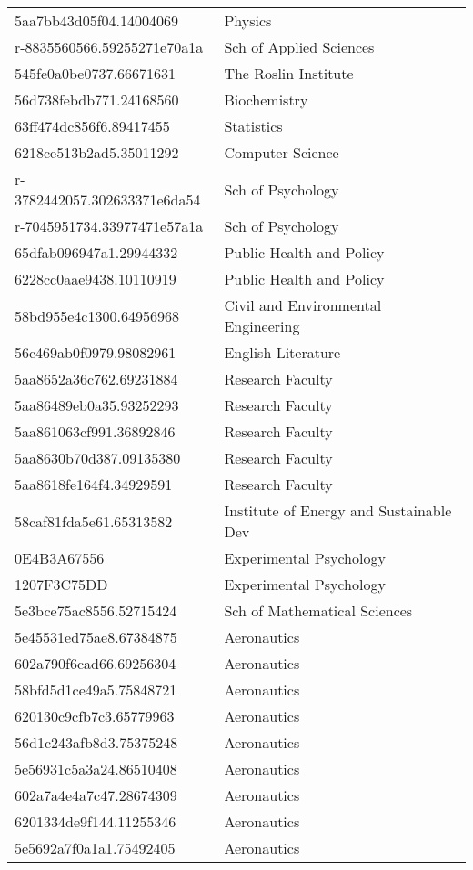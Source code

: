 \begin{tabular}{ll}
5aa7bb43d05f04.14004069 & Physics \\
r-8835560566.59255271e70a1a & Sch of Applied Sciences \\
545fe0a0be0737.66671631 & The Roslin Institute \\
56d738febdb771.24168560 & Biochemistry \\
63ff474dc856f6.89417455 & Statistics \\
6218ce513b2ad5.35011292 & Computer Science \\
r-3782442057.302633371e6da54 & Sch of Psychology \\
r-7045951734.33977471e57a1a & Sch of Psychology \\
65dfab096947a1.29944332 & Public Health and Policy \\
6228cc0aae9438.10110919 & Public Health and Policy \\
58bd955e4c1300.64956968 & Civil and Environmental Engineering \\
56c469ab0f0979.98082961 & English Literature \\
5aa8652a36c762.69231884 & Research Faculty \\
5aa86489eb0a35.93252293 & Research Faculty \\
5aa861063cf991.36892846 & Research Faculty \\
5aa8630b70d387.09135380 & Research Faculty \\
5aa8618fe164f4.34929591 & Research Faculty \\
58caf81fda5e61.65313582 & Institute of Energy and Sustainable Dev \\
0E4B3A67556 & Experimental Psychology \\
1207F3C75DD & Experimental Psychology \\
5e3bce75ac8556.52715424 & Sch of Mathematical Sciences \\
5e45531ed75ae8.67384875 & Aeronautics \\
602a790f6cad66.69256304 & Aeronautics \\
58bfd5d1ce49a5.75848721 & Aeronautics \\
620130c9cfb7c3.65779963 & Aeronautics \\
56d1c243afb8d3.75375248 & Aeronautics \\
5e56931c5a3a24.86510408 & Aeronautics \\
602a7a4e4a7c47.28674309 & Aeronautics \\
6201334de9f144.11255346 & Aeronautics \\
5e5692a7f0a1a1.75492405 & Aeronautics \\

\end{tabular}
